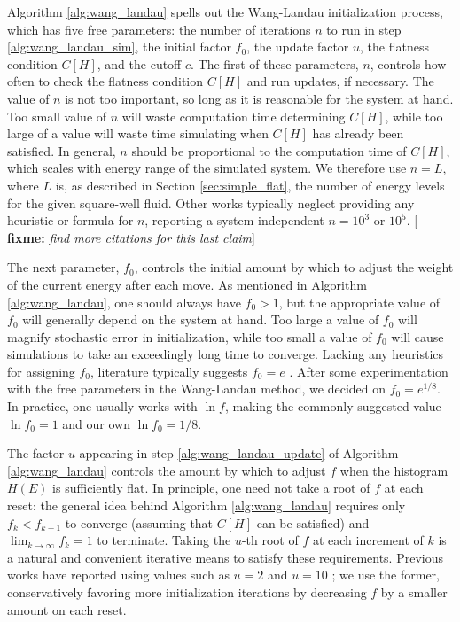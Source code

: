 \documentclass[11pt]{article}
\newcommand{\p}[1]{\left(#1\right)} %
\renewcommand{\sp}[1]{\left[#1\right]} %
\newcommand{\red}[1]{{\bf \color{red} #1}}
\newcommand{\fixme}[1]{[\red{fixme:} \emph{#1}]}
\begin{document}
Algorithm \ref{alg:wang_landau} spells out the Wang-Landau
initialization process, which has five free parameters: the number of
iterations $n$ to run in step \ref{alg:wang_landau_sim}, the initial
factor $f_0$, the update factor $u$, the flatness condition $C\sp{H}$,
and the cutoff $c$. The first of these parameters, $n$, controls how
often to check the flatness condition $C\sp{H}$ and run updates, if
necessary. The value of $n$ is not too important, so long as it is
reasonable for the system at hand. Too small value of $n$ will waste
computation time determining $C\sp{H}$, while too large of a value
will waste time simulating when $C\sp{H}$ has already been
satisfied. In general, $n$ should be proportional to the computation
time of $C\sp{H}$, which scales with energy range of the simulated
system. We therefore use $n=L$, where $L$ is, as described in Section
\ref{sec:simple_flat}, the number of energy levels for the given
square-well fluid. Other works typically neglect providing any
heuristic or formula for $n$, reporting a system-independent
$n=10^3$\cite{wang_landau_mod} or $10^5$\cite{wang_landau}.
\fixme{find more citations for this last claim}

The next parameter, $f_0$, controls the initial amount by which to
adjust the weight of the current energy after each move. As mentioned
in Algorithm \ref{alg:wang_landau}, one should always have $f_0>1$,
but the appropriate value of $f_0$ will generally depend on the system
at hand. Too large a value of $f_0$ will magnify stochastic error in
initialization, while too small a value of $f_0$ will cause
simulations to take an exceedingly long time to converge. Lacking any
heuristics for assigning $f_0$, literature typically suggests $f_0=e$
\cite{wang_landau}. After some experimentation with the free
parameters in the Wang-Landau method, we decided on $f_0=e^{1/8}$. In
practice, one usually works with $\ln f$, making the commonly
suggested value $\ln f_0=1$ and our own $\ln f_0=1/8$.

The factor $u$ appearing in step \ref{alg:wang_landau_update} of
Algorithm \ref{alg:wang_landau} controls the amount by which to adjust
$f$ when the histogram $H\p{E}$ is sufficiently flat. In principle,
one need not take a root of $f$ at each reset: the general idea behind
Algorithm \ref{alg:wang_landau} requires only $f_k<f_{k-1}$ to
converge (assuming that $C\sp{H}$ can be satisfied) and
$\lim_{k\to\infty}f_k=1$ to terminate. Taking the $u$-th root of $f$
at each increment of $k$ is a natural and convenient iterative means
to satisfy these requirements. Previous works have reported using
values such as $u=2$ \cite{wang_landau, wang_landau_mod} and $u=10$
\cite{wang_landau_analysis}; we use the former, conservatively
favoring more initialization iterations by decreasing $f$ by a smaller
amount on each reset.
\end{document}
